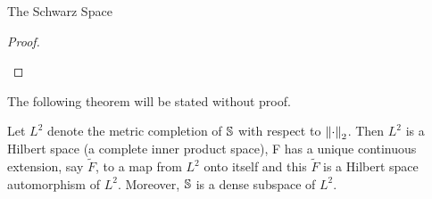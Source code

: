 \begin{section}{The Schwarz Space}
\begin{proof}
\begin{enumerate}[i)]
	\end{enumerate}
\end{proof}


	The following theorem will be stated without proof.
	
\begin{thrm}
	Let $L^2$ denote the metric completion of $\schwarz$ with respect
	to $\norm[2]{\cdot}$. Then $L^2$ is a Hilbert space (a complete
	inner product space), F has a unique continuous extension, say
	$\tilde{F}$, to a map from $L^2$ onto itself and this $\tilde{F}$
	is a Hilbert space automorphism of $L^2$. Moreover, $\schwarz$ is
	a dense subspace of $L^2$.
\end{thrm}

\end{section}